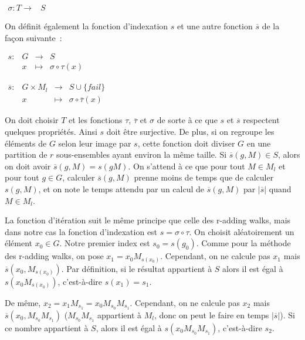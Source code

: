       $\begin{array}{lrcl}
        \sigma : T \longrightarrow & S
      \end{array}$

      On définit également la fonction d'indexation $s$ et une autre fonction $\overline{s}$ de la façon suivante~:

      $\begin{array}{lrcl}
        s : & G & \longrightarrow & S \\
            & x & \longmapsto & \sigma \circ \tau (x)
      \end{array}$

      $\begin{array}{lrcl}
        \overline{s} : & G \times M_l & \longrightarrow & S \cup \{fail\} \\
                       & x & \longmapsto & \sigma \circ \overline{\tau} (x)
      \end{array}$

      On doit choisir $T$ et les fonctions $\tau$, $\overline{\tau}$ et $\sigma$ de sorte à ce que $s$ et $\overline{s}$ respectent quelques propriétés. Ainsi $s$ doit être surjective. De plus, si on regroupe les éléments de $G$ selon leur image par $s$, cette fonction doit diviser $G$ en une partition de $r$ sous-ensembles ayant environ la même taille. Si $\overline{s}(g,M) \in S$, alors on doit avoir $\overline{s}(g,M) = s(g M)$. On s'attend à ce que pour tout $M \in M_l$ et pour tout $g \in G$, calculer $\overline{s}(g,M)$ prenne moins de temps que de calculer $s(g,M)$, et on note le temps attendu par un calcul de $\overline{s}(g,M)$ par $|\overline{s}|$ quand $M \in M_l$.

      La fonction d'itération suit le même principe que celle des r-adding walks, mais dans notre cas la fonction d'indexation est $s = \sigma \circ \tau$. On choisit aléatoirement un élément $x_0 \in G$. Notre premier index est $s_0 = s(g_0)$. Comme pour la méthode des r-adding walks, on pose $x_1 = x_0 M_{s(x_0)}$. Cependant, on ne calcule pas $x_1$ mais $\overline{s}(x_0,M_{s(x_0)})$. Par définition, si le résultat appartient à $S$ alors il est égal à $s(x_0 M_{s(x_0)})$, c'est-à-dire $s(x_1) = s_1$.

      De même, $x_2 = x_1 M_{s_1} = x_0 M_{s_0} M_{s_1}$. Cependant, on ne calcule pas $x_2$ mais $\overline{s}(x_0,M_{s_0} M_{s_1})$ ($M_{s_0} M_{s_1}$ appartient à $M_l$, donc on peut le faire en temps $|\overline{s}|$). Si ce nombre appartient à $S$, alors il est égal à $s(x_0 M_{s_0} M_{s_1})$, c'est-à-dire $s_2$.

